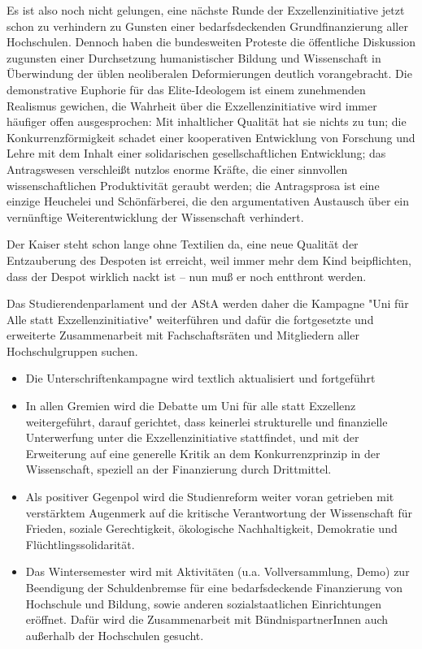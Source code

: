 \documentclass[ngerman,headheight=70pt]{scrartcl}
\begin{document}
    Es ist also noch nicht gelungen, eine nächste Runde der Exzellenzinitiative
    jetzt schon zu verhindern zu Gunsten einer bedarfsdeckenden Grundfinanzierung
    aller Hochschulen. Dennoch haben die bundesweiten Proteste die öffentliche
    Diskussion zugunsten einer Durchsetzung humanistischer Bildung und Wissenschaft
    in Überwindung der üblen neoliberalen Deformierungen deutlich vorangebracht.
    Die demonstrative Euphorie für das Elite-Ideologem ist einem zunehmenden
    Realismus gewichen, die Wahrheit über die Exzellenzinitiative wird immer
    häufiger offen ausgesprochen: Mit inhaltlicher Qualität hat sie nichts zu tun;
    die Konkurrenzförmigkeit schadet einer kooperativen Entwicklung von Forschung
    und Lehre mit dem Inhalt einer solidarischen gesellschaftlichen Entwicklung;
    das Antragswesen verschleißt nutzlos enorme Kräfte, die einer sinnvollen
    wissenschaftlichen Produktivität geraubt werden; die Antragsprosa ist eine
    einzige Heuchelei und Schönfärberei, die den argumentativen Austausch über
    ein vernünftige Weiterentwicklung der Wissenschaft verhindert.

    Der Kaiser steht schon lange ohne Textilien da, eine neue Qualität der
    Entzauberung des Despoten ist erreicht, weil immer mehr dem Kind beipflichten,
    dass der Despot wirklich nackt ist -- nun muß er noch entthront werden.

    Das Studierendenparlament und der AStA werden daher die Kampagne "Uni für
    Alle statt Exzellenzinitiative" weiterführen und dafür die fortgesetzte und
    erweiterte Zusammenarbeit mit Fachschaftsräten und Mitgliedern aller
    Hochschulgruppen suchen.

    \begin{itemize}
        \item Die Unterschriftenkampagne wird textlich aktualisiert und fortgeführt
        \item In allen Gremien wird die Debatte um Uni für alle statt Exzellenz
        weitergeführt, darauf gerichtet, dass keinerlei strukturelle und
        finanzielle Unterwerfung unter die Exzellenzinitiative stattfindet, und
        mit der Erweiterung auf eine generelle Kritik an dem Konkurrenzprinzip
        in der Wissenschaft, speziell an der Finanzierung durch Drittmittel.
        \item Als positiver Gegenpol wird die Studienreform weiter voran getrieben
        mit verstärktem Augenmerk auf die kritische Verantwortung der Wissenschaft
        für Frieden, soziale Gerechtigkeit, ökologische Nachhaltigkeit, Demokratie
        und Flüchtlingssolidarität.
        \item Das Wintersemester wird mit Aktivitäten (u.a. Vollversammlung, Demo)
        zur Beendigung der Schuldenbremse für eine bedarfsdeckende Finanzierung
        von Hochschule und Bildung, sowie anderen sozialstaatlichen Einrichtungen
        eröffnet. Dafür wird die Zusammenarbeit mit BündnispartnerInnen auch
        außerhalb der Hochschulen gesucht.
    \end{itemize}
\end{document}
